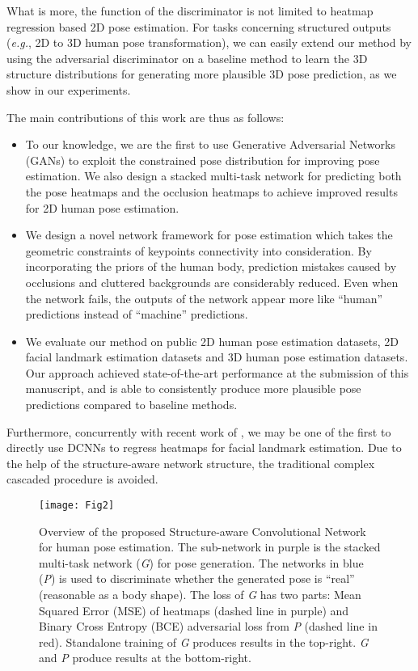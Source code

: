 \documentclass[10pt,journal,compsoc]{IEEEtran}
\begin{document}
What is more, the function of the discriminator is not limited to heatmap regression based 2D pose estimation.
For tasks concerning structured outputs (\emph{e.g.}, 2D to 3D human pose transformation), we can easily extend our method by using the adversarial discriminator on a baseline method to learn the 3D structure distributions for generating more plausible 3D pose prediction, as we show in our experiments.

The main contributions of this work are thus as follows:
\begin{itemize}
%
\leftskip=0pt \rightskip=0pt plus 0cm
\item To our knowledge, we are the first to use Generative Adversarial Networks (GANs) to exploit the constrained pose distribution for improving pose estimation. We also design a stacked multi-task network for predicting both the pose heatmaps and the occlusion heatmaps to achieve improved results for 2D human pose estimation.

\item We design a novel network framework for pose estimation which takes the geometric constraints of keypoints connectivity into consideration. By incorporating the priors of the human body, prediction mistakes caused by occlusions and cluttered backgrounds are considerably reduced. Even when the network fails, the outputs of the network appear more like ``human'' predictions instead of ``machine'' predictions.

\item We evaluate our method on public 2D human pose estimation datasets, 2D facial landmark estimation datasets and 3D human pose estimation datasets. Our approach achieved state-of-the-art performance at the submission of this manuscript, and is able to consistently produce more plausible pose predictions compared to baseline methods.
\end{itemize}

Furthermore, concurrently with recent work of \cite{bulat2017far}, we may be one of the first to directly use DCNNs to regress heatmaps for facial landmark estimation.
Due to the help of the structure-aware network structure, the traditional complex cascaded procedure is avoided.

\begin{figure*}[!t]
\centering
\texttt{[image: Fig2]}
%
\caption{Overview of the proposed Structure-aware Convolutional Network for human pose estimation. The sub-network in purple is the stacked multi-task network (\emph{G}) for pose generation. The networks in blue (\emph{P}) is used to discriminate whether the generated pose is ``real'' (reasonable as a body shape). The loss of \emph{G} has two parts: Mean Squared Error (MSE) of heatmaps (dashed line in purple) and Binary Cross Entropy (BCE) adversarial loss from \emph{P} (dashed line in red). Standalone training of \emph{G} produces results in the top-right. \emph{G} and \emph{P} produce results at the bottom-right.
}
\label{fig:Structure-of-the}
\end{figure*}
\end{document}
